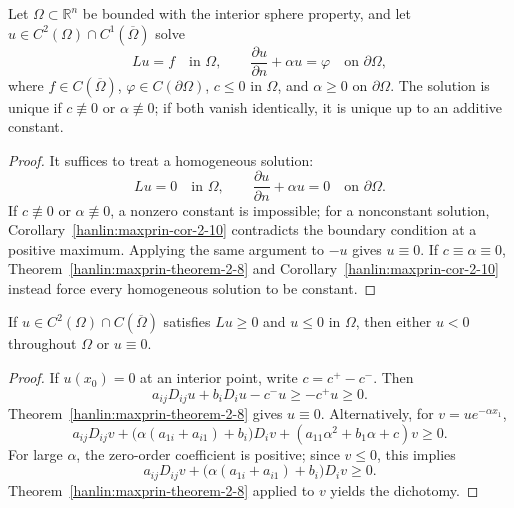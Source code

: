 \begin{corollary}\label{hanlin:maxprin-cor-2-11}
Let $\Omega\subset\mathbb{R}^n$ be bounded with the interior sphere property,
and let $u\in C^2(\Omega)\cap C^1(\overline\Omega)$ solve
\[
Lu=f\quad\text{in }\Omega,
\qquad
\frac{\partial u}{\partial n}+\alpha u=\varphi
\quad\text{on }\partial\Omega,
\]
where $f\in C(\overline\Omega)$, $\varphi\in C(\partial\Omega)$, $c\le0$ in
$\Omega$, and $\alpha\ge0$ on $\partial\Omega$. The solution is unique if
$c\not\equiv0$ or $\alpha\not\equiv0$; if both vanish identically, it is unique
up to an additive constant.
\end{corollary}
\begin{proof}
\sketch It suffices to treat a homogeneous solution:
\[
Lu=0\quad\text{in }\Omega,
\qquad
\frac{\partial u}{\partial n}+\alpha u=0
\quad\text{on }\partial\Omega.
\]
If $c\not\equiv0$ or $\alpha\not\equiv0$, a nonzero constant is impossible; for
a nonconstant solution, Corollary~\ref{hanlin:maxprin-cor-2-10} contradicts the
boundary condition at a positive maximum. Applying the same argument to $-u$
gives $u\equiv0$. If $c\equiv\alpha\equiv0$, Theorem~\ref{hanlin:maxprin-theorem-2-8}
and Corollary~\ref{hanlin:maxprin-cor-2-10} instead force every homogeneous
solution to be constant.
\end{proof}

\begin{theorem}\label{hanlin:maxprin-theorem-2-12}


If $u\in C^2(\Omega)\cap C(\overline\Omega)$ satisfies $Lu\ge0$ and $u\le0$ in
$\Omega$, then either $u<0$ throughout $\Omega$ or $u\equiv0$.
\end{theorem}
\begin{proof}
\sketch If $u(x_0)=0$ at an interior point, write $c=c^+-c^-$. Then
\[
a_{ij}D_{ij}u+b_iD_iu-c^-u\ge -c^+u\ge 0.
\]
Theorem~\ref{hanlin:maxprin-theorem-2-8} gives $u\equiv0$. Alternatively, for
$v=ue^{-\alpha x_1}$,
\[
a_{ij}D_{ij}v+\bigl(\alpha(a_{1i}+a_{i1})+b_i\bigr)D_iv+(a_{11}\alpha^2+b_1\alpha+c)v\ge 0.
\]
For large $\alpha$, the zero-order coefficient is positive; since $v\le0$, this
implies
\[
a_{ij}D_{ij}v+\bigl(\alpha(a_{1i}+a_{i1})+b_i\bigr)D_iv\ge 0.
\]
Theorem~\ref{hanlin:maxprin-theorem-2-8} applied to $v$ yields the dichotomy.
\end{proof}


